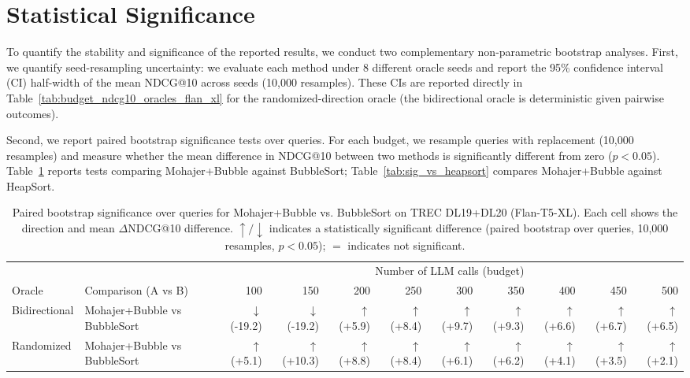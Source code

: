 \documentclass[11pt]{article}
\begin{document}
\section{Statistical Significance}
\label{sec:significance}
\renewcommand{\thetable}{A.\arabic{table}}  %

To quantify the stability and significance of the reported results, we conduct two complementary non-parametric bootstrap analyses. First, we quantify seed-resampling uncertainty: we evaluate each method under 8 different oracle seeds and report the 95\% confidence interval (CI) half-width of the mean NDCG@10 across seeds (10,000 resamples). These CIs are reported directly in Table~\ref{tab:budget_ndcg10_oracles_flan_xl} for the randomized-direction oracle (the bidirectional oracle is deterministic given pairwise outcomes). 

Second, we report paired bootstrap significance tests over queries. For each budget, we resample queries with replacement (10,000 resamples) and measure whether the mean difference in NDCG@10 between two methods is significantly different from zero ($p < 0.05$). Table~\ref{tab:sig_vs_bubble} reports tests comparing Mohajer+Bubble against BubbleSort; Table~\ref{tab:sig_vs_heapsort} compares Mohajer+Bubble against HeapSort.

\begin{table}[H]
\centering
\scriptsize
\begin{adjustbox}{max width=\linewidth}
\begin{tabular}{llrrrrrrrrr}
\toprule
& & \multicolumn{9}{c}{Number of LLM calls (budget)} \\
\cmidrule(lr){3-11}
Oracle & Comparison (A vs B) & 100 & 150 & 200 & 250 & 300 & 350 & 400 & 450 & 500 \\
\midrule
Bidirectional & Mohajer+Bubble vs BubbleSort     & $\downarrow$ (-19.2) & $\downarrow$ (-19.2) & $\uparrow$ (+5.9) & $\uparrow$ (+8.4) & $\uparrow$ (+9.7) & $\uparrow$ (+9.3) & $\uparrow$ (+6.6) & $\uparrow$ (+6.7) & $\uparrow$ (+6.5) \\
Randomized    & Mohajer+Bubble vs BubbleSort     & $\uparrow$ (+5.1) & $\uparrow$ (+10.3) & $\uparrow$ (+8.8) & $\uparrow$ (+8.4) & $\uparrow$ (+6.1) & $\uparrow$ (+6.2) & $\uparrow$ (+4.1) & $\uparrow$ (+3.5) & $\uparrow$ (+2.1) \\
\bottomrule
\end{tabular}
\end{adjustbox}
\caption{Paired bootstrap significance over queries for Mohajer+Bubble vs. BubbleSort on TREC DL19+DL20 (Flan-T5-XL). Each cell shows the direction and mean $\Delta$NDCG@10 difference. $\uparrow/\downarrow$ indicates a statistically significant difference (paired bootstrap over queries, 10,000 resamples, $p < 0.05$); $=$ indicates not significant.}
\label{tab:sig_vs_bubble}
\end{table}
\end{document}
